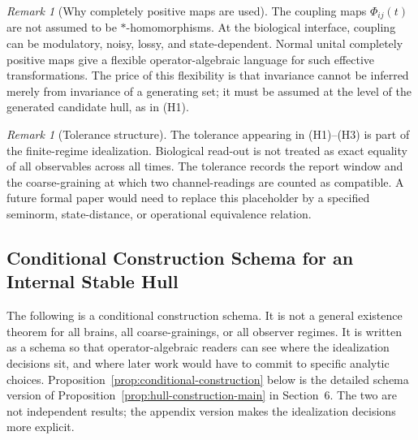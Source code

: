 \documentclass[12pt]{article}
\theoremstyle{definition}
\theoremstyle{remark}
\newtheorem{remark}[proposition]{Remark}
\begin{document}
\begin{remark}[Why completely positive maps are used]
The coupling maps \(\Phi_{ij}(t)\) are not assumed to be
\(*\)-homomorphisms. At the biological interface, coupling can be
modulatory, noisy, lossy, and state-dependent. Normal unital completely
positive maps give a flexible operator-algebraic language for such
effective transformations. The price of this flexibility is that
invariance cannot be inferred merely from invariance of a generating
set; it must be assumed at the level of the generated candidate hull, as
in (H1).
\end{remark}

\begin{remark}[Tolerance structure]
The tolerance appearing in (H1)--(H3) is part of the finite-regime
idealization. Biological read-out is not treated as exact equality of
all observables across all times. The tolerance records the report
window and the coarse-graining at which two channel-readings are counted
as compatible. A future formal paper would need to replace this
placeholder by a specified seminorm, state-distance, or operational
equivalence relation.
\end{remark}

\subsection{Conditional Construction Schema for an Internal Stable Hull}

The following is a conditional construction schema. It is not a general
existence theorem for all brains, all coarse-grainings, or all observer
regimes. It is written as a schema so that operator-algebraic readers
can see where the idealization decisions sit, and where later work
would have to commit to specific analytic choices.
Proposition~\ref{prop:conditional-construction} below is the detailed
schema version of Proposition~\ref{prop:hull-construction-main} in
Section~6. The two are not independent results; the appendix version
makes the idealization decisions more explicit.
\end{document}
